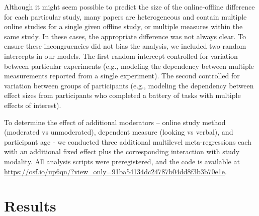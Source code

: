 \documentclass[
  man,floatsintext]{apa6}
\begin{document}
Although it might seem possible to predict the size of the online-offline difference for each particular study, many papers are heterogeneous and contain multiple online studies for a single given offline study, or multiple measures within the same study. In these cases, the appropriate difference was not always clear. To ensure these incongruencies did not bias the analysis, we included two random intercepts in our models. The first random intercept controlled for variation between particular experiments (e.g., modeling the dependency between multiple measurements reported from a single experiment). The second controlled for variation between groups of participants (e.g., modeling the dependency between effect sizes from participants who completed a battery of tasks with multiple effects of interest).

To determine the effect of additional moderators -- online study method (moderated vs unmoderated), dependent measure (looking vs verbal), and participant age - we conducted three additional multilevel meta-regressions each with an additional fixed effect plus the corresponding interaction with study modality. All analysis scripts were preregistered, and the code is available at \url{https://osf.io/up6qn/?view_only=91ba54134dc24787b04dd8f3b3b70e1e}.

\hypertarget{results}{%
\section{Results}\label{results}}
\end{document}
